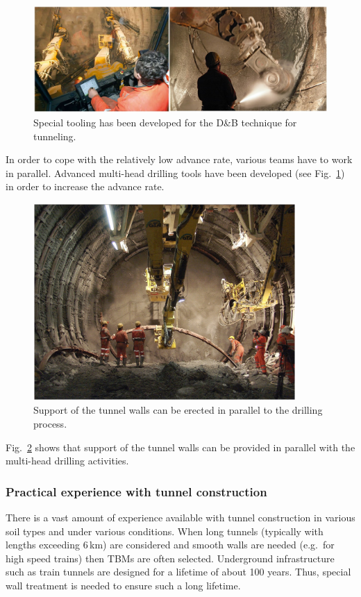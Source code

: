 \begin{figure}[htbp!]
\centering
\includegraphics[width=16cm]{./Sec_SiteInfra/Figures/multihead.jpg}
\caption{Special tooling has been developed for the D\&B technique for tunneling.}
\label{fig:multihead}
\end{figure}
In order to cope with the relatively low advance rate, various teams
have to work in parallel. Advanced multi-head drilling tools have been
developed (see Fig.~\ref{fig:multihead}) in order to increase the advance rate.
\begin{figure}[htbp!]
\centering
\includegraphics[width=10cm]{./Sec_SiteInfra/Figures/support.jpg}
\caption{Support of the tunnel walls can be erected in parallel to the drilling process.}
\label{fig:support}
\end{figure}
Fig.~\ref{fig:support} shows that support of the tunnel walls can be provided
in parallel with the multi-head drilling activities.

\subsubsection*{Practical experience with tunnel construction}

There is a vast amount of experience available with tunnel construction
in various soil types and under various conditions. When long tunnels (typically with
lengths exceeding 6\,km) are considered and smooth walls are needed
(e.g.\ for high speed trains) then TBMs are often selected. Underground
infrastructure such as train tunnels are designed for a lifetime of about
100 years. Thus, special wall treatment is needed to ensure such a long lifetime.

